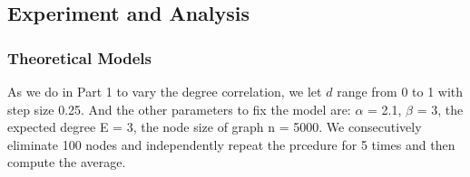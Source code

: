 \documentclass{article}
\begin{document}
\subsection{Experiment and Analysis}

\subsubsection{Theoretical Models}

\par As we do in Part 1 to vary the degree correlation, we let $d$ range from 0 to 1 with step size 0.25. And the other parameters to fix the model are: $\alpha$ = 2.1, $\beta$ = 3, the expected degree E = 3, the node size of graph n = 5000. We consecutively eliminate 100 nodes and independently repeat the prcedure for 5 times and then compute the average.
\end{document}
